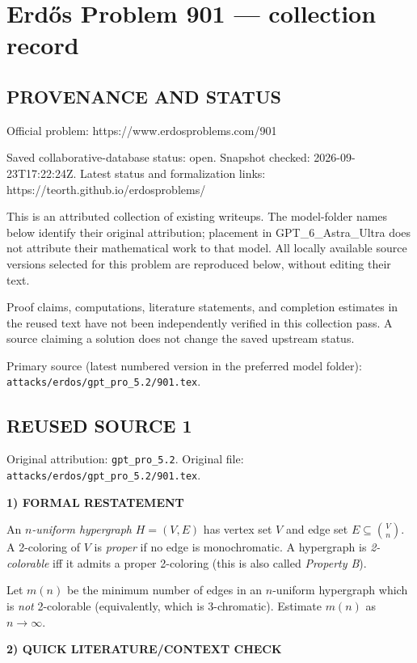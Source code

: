 \section*{Erd\H{o}s Problem 901 --- collection record}

\subsection*{PROVENANCE AND STATUS}
Official problem: https://www.erdosproblems.com/901

Saved collaborative-database status: open.
Snapshot checked: 2026-09-23T17:22:24Z.
Latest status and formalization links: https://teorth.github.io/erdosproblems/

This is an attributed collection of existing writeups. The model-folder names below identify their original attribution; placement in GPT\_6\_Astra\_Ultra does not attribute their mathematical work to that model. All locally available source versions selected for this problem are reproduced below, without editing their text.

Proof claims, computations, literature statements, and completion estimates in the reused text have not been independently verified in this collection pass. A source claiming a solution does not change the saved upstream status.

Primary source (latest numbered version in the preferred model folder): \texttt{attacks/erdos/gpt\_pro\_5.2/901.tex}.

\subsection*{REUSED SOURCE 1}
Original attribution: \texttt{gpt\_pro\_5.2}.
Original file: \texttt{attacks/erdos/gpt\_pro\_5.2/901.tex}.



\noindent\textbf{1) FORMAL RESTATEMENT}

An \emph{$n$-uniform hypergraph} $H=(V,E)$ has vertex set $V$ and edge set
$E\subseteq\binom{V}{n}$.
A 2-coloring of $V$ is \emph{proper} if no edge is monochromatic.
A hypergraph is \emph{2-colorable} iff it admits a proper 2-coloring (this is
also called \emph{Property B}).

Let $m(n)$ be the minimum number of edges in an $n$-uniform hypergraph which is
\emph{not} 2-colorable (equivalently, which is 3-chromatic).
Estimate $m(n)$ as $n\to\infty$.

\medskip
\noindent\textbf{2) QUICK LITERATURE/CONTEXT CHECK}

